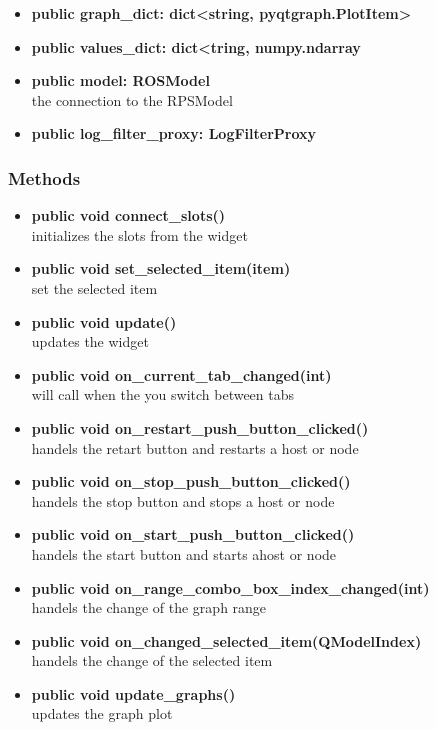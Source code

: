 \begin{itemize}
  \item \textbf{public graph\_dict: dict<string, pyqtgraph.PlotItem>}\\
  
  \item \textbf{public values\_dict: dict<tring, numpy.ndarray}\\
  
  \item \textbf{public model: ROSModel}\\
  the connection to the RPSModel
  \item \textbf{public log\_filter\_proxy: LogFilterProxy}\\
  
\end{itemize}
\subsubsection{Methods}
\begin{itemize}
  \item \textbf{public void connect\_slots()}\\
  initializes the slots from the widget
  \item \textbf{public void set\_selected\_item(item)}\\
  set the selected item
  \item \textbf{public void update()}\\
  updates the widget
  \item \textbf{public void on\_current\_tab\_changed(int)}\\
  will call when the you switch between tabs
  \item \textbf{public void on\_restart\_push\_button\_clicked()}\\
  handels the retart button and restarts a host or node
  \item \textbf{public void on\_stop\_push\_button\_clicked()}\\
  handels the stop button and stops a host or node
  \item \textbf{public void on\_start\_push\_button\_clicked()}\\
  handels the start button and starts ahost or node
  \item \textbf{public void on\_range\_combo\_box\_index\_changed(int)}\\
  handels the change of the graph range
  \item \textbf{public void on\_changed\_selected\_item(QModelIndex)}\\
  handels the change of the selected item
  \item \textbf{public void update\_graphs()}\\
  updates the graph plot
\end{itemize}



